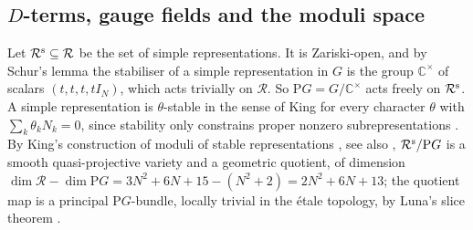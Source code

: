 \documentclass[11pt]{amsart}
\theoremstyle{definition}
\newcommand{\CC}{\mathbb{C}}
\newcommand{\cR}{\mathcal R}
\newcommand{\PG}{\mathrm{P}G}
\begin{document}
\subsection{\texorpdfstring{$D$}{D}-terms, gauge fields and the moduli space}
Let $\cR^{\rm s}\subseteq\cR$ be the set of simple representations. It is Zariski-open, and by Schur's lemma the stabiliser of a simple representation in $G$ is the group $\CC^\times$ of scalars $(t,t,t,tI_N)$, which acts trivially on $\cR$. So $\PG=G/\CC^\times$ acts freely on $\cR^{\rm s}$. A simple representation is $\theta$-stable in the sense of King for every character $\theta$ with $\sum_k\theta_kN_k=0$, since stability only constrains proper nonzero subrepresentations \cite{Kin94}. By King's construction of moduli of stable representations \cite{Kin94}, see also \cite{CB01}, $\cR^{\rm s}/\PG$ is a smooth quasi-projective variety and a geometric quotient, of dimension $\dim\cR-\dim\PG=3N^2+6N+15-(N^2+2)=2N^2+6N+13$; the quotient map is a principal $\PG$-bundle, locally trivial in the étale topology, by Luna's slice theorem \cite{MFK94}.
\end{document}
